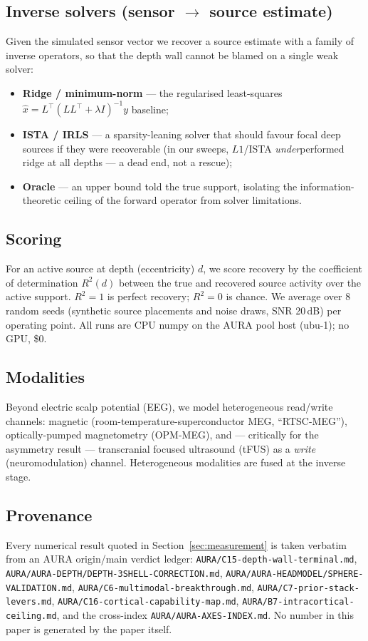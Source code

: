 \documentclass[11pt]{article}
\newcommand{\Rsq}{R^{2}}
\begin{document}
\subsection{Inverse solvers (sensor $\rightarrow$ source estimate)}
Given the simulated sensor vector we recover a source estimate with a family of
inverse operators, so that the depth wall cannot be blamed on a single weak solver:
\begin{itemize}
  \item \textbf{Ridge / minimum-norm} --- the regularised least-squares
        $\hat{x} = L^{\!\top}(LL^{\!\top}+\lambda I)^{-1} y$ baseline;
  \item \textbf{ISTA / IRLS} --- a sparsity-leaning solver that should favour focal
        deep sources if they were recoverable (in our sweeps, $L1$/ISTA
        \emph{under}performed ridge at all depths --- a dead end, not a rescue);
  \item \textbf{Oracle} --- an upper bound told the true support, isolating the
        information-theoretic ceiling of the forward operator from solver
        limitations.
\end{itemize}

\subsection{Scoring}
For an active source at depth (eccentricity) $d$, we score recovery by the
coefficient of determination $\Rsq(d)$ between the true and recovered source activity
over the active support. $\Rsq = 1$ is perfect recovery; $\Rsq = 0$ is chance. We
average over 8 random seeds (synthetic source placements and noise draws, SNR
20\,dB) per operating point. All runs are CPU numpy on the AURA pool host (ubu-1);
no GPU, \$0.

\subsection{Modalities}
Beyond electric scalp potential (EEG), we model heterogeneous read/write channels:
magnetic (room-temperature-superconductor MEG, ``RTSC-MEG''), optically-pumped
magnetometry (OPM-MEG), and --- critically for the asymmetry result --- transcranial
focused ultrasound (tFUS) as a \emph{write} (neuromodulation) channel. Heterogeneous
modalities are fused at the inverse stage.

\subsection{Provenance}
Every numerical result quoted in Section~\ref{sec:measurement} is taken verbatim
from an AURA origin/main verdict ledger:
\texttt{AURA/C15-depth-wall-terminal.md},
\texttt{AURA/AURA-DEPTH/DEPTH-3SHELL-CORRECTION.md},
\texttt{AURA/AURA-HEADMODEL/SPHERE-VALIDATION.md},
\texttt{AURA/C6-multimodal-breakthrough.md},
\texttt{AURA/C7-prior-stack-levers.md},
\texttt{AURA/C16-cortical-capability-map.md},
\texttt{AURA/B7-intracortical-ceiling.md}, and the cross-index
\texttt{AURA/AURA-AXES-INDEX.md}. No number in this paper is generated by the paper
itself.
\end{document}
